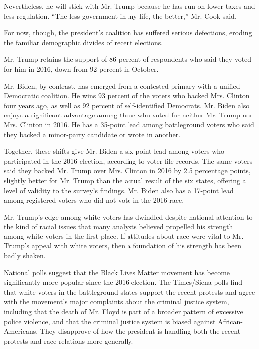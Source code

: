 Nevertheless, he will stick with Mr. Trump because he has run on lower
taxes and less regulation. ``The less government in my life, the
better,'' Mr. Cook said.

For now, though, the president's coalition has suffered serious
defections, eroding the familiar demographic divides of recent
elections.

Mr. Trump retains the support of 86 percent of respondents who said they
voted for him in 2016, down from 92 percent in October.

Mr. Biden, by contrast, has emerged from a contested primary with a
unified Democratic coalition. He wins 93 percent of the voters who
backed Mrs. Clinton four years ago, as well as 92 percent of
self-identified Democrats. Mr. Biden also enjoys a significant advantage
among those who voted for neither Mr. Trump nor Mrs. Clinton in 2016. He
has a 35-point lead among battleground voters who said they backed a
minor-party candidate or wrote in another.

Together, these shifts give Mr. Biden a six-point lead among voters who
participated in the 2016 election, according to voter-file records. The
same voters said they backed Mr. Trump over Mrs. Clinton in 2016 by 2.5
percentage points, slightly better for Mr. Trump than the actual result
of the six states, offering a level of validity to the survey's
findings. Mr. Biden also has a 17-point lead among registered voters who
did not vote in the 2016 race.

Mr. Trump's edge among white voters has dwindled despite national
attention to the kind of racial issues that many analysts believed
propelled his strength among white voters in the first place. If
attitudes about race were vital to Mr. Trump's appeal with white voters,
then a foundation of his strength has been badly shaken.

\href{https://www.nytimes3xbfgragh.onion/interactive/2020/06/10/upshot/black-lives-matter-attitudes.html}{National
polls suggest} that the Black Lives Matter movement has become
significantly more popular since the 2016 election. The Times/Siena
polls find that white voters in the battleground states support the
recent protests and agree with the movement's major complaints about the
criminal justice system, including that the death of Mr. Floyd is part
of a broader pattern of excessive police violence, and that the criminal
justice system is biased against African-Americans. They disapprove of
how the president is handling both the recent protests and race
relations more generally.

